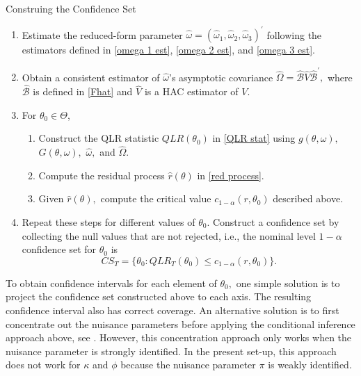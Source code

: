 \documentclass[11pt, letterpaper, twoside]{article}
\begin{document}
\begin{algorithm}
    \caption{Construing the Confidence Set}
    \label{alg:constructing_the_cs}
    
    \begin{enumerate}
        \item Estimate the reduced-form parameter $\widehat{\omega }=( \widehat{\omega }_{1},\widehat{\omega }_{2},\widehat{\omega }_{3})^{\prime }$ following the estimators defined in \cref{omega 1 est}, \cref{omega 2 est}, and  \cref{omega 3 est}.
%
        \item Obtain a consistent estimator of $\widehat{\omega}$'s asymptotic covariance $\widehat{ \Omega }=\widehat{\mathcal{B}}\widehat{V}\widehat{\mathcal{B}}^{\prime },$ where $\widehat{\mathcal{B}}$ is defined in \cref{Fhat} and $\widehat{V}$ is a HAC estimator of $V.$

        \item For $\theta _{0}\in \Theta$,
%
        \begin{enumerate}
            \item Construct the QLR statistic $QLR(\theta _{0})$ in \cref{QLR stat} using $g(\theta ,\omega ),$ $G(\theta ,\omega ),$ $\widehat{\omega },$ and $\widehat{\Omega }.$
%
            \item Compute the residual process $\widehat{r}(\theta )$ in \cref{red process}.

            \item Given $\widehat{r}(\theta ),$ compute the critical value $c_{1-\alpha }(r,\theta _{0})$ described above.
%
        \end{enumerate}
%
        \item Repeat these steps for different values of $\theta _{0}$.  Construct a confidence set by collecting the null values that are not rejected, i.e., the nominal level $1-\alpha $ confidence set for $\theta _{0}$ is
%
            \begin{equation}
                CS_{T}=\{ \theta _{0}:QLR_{T}(\theta _{0})\leq c_{1-\alpha }(r,\theta_{0})\}.
            \end{equation}
    \end{enumerate}
\end{algorithm}

To obtain confidence intervals for each element of $\theta _{0},$ one simple solution is to project the confidence set constructed above to each axis. The resulting confidence interval also has correct coverage. An alternative solution is to first concentrate out the nuisance parameters before applying the conditional inference approach above, see \textcite[Section 5]{andrews2016conditional}.  However, this concentration approach only works when the nuisance parameter is strongly identified. In the present set-up, this approach does not work for $\kappa $ and $\phi $ because the nuisance parameter $\pi $ is weakly identified.  
\end{document}
